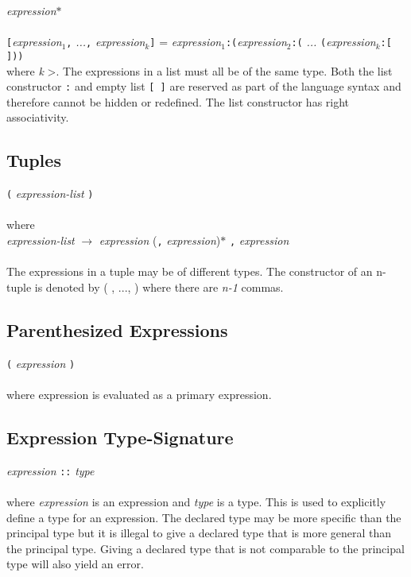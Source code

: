   \emph{expression}$*$ \\ \\
\texttt{[}\emph{expression$_{1}$}\texttt{,} \emph{...}\texttt{,} \emph{expression$_{k}$}\texttt{]} = 
  \emph{expression$_{1}$}\texttt{:(}\emph{expression$_{2}$}\texttt{:(} \emph{...} \texttt{(}\emph{expression$_{k}$}\texttt{:[ ]))} \\ 
where \textit{k} \textgreater{}. The expressions in a list must all be of the same type. Both the list constructor \texttt{:} and empty list \texttt{[ ]} are reserved as part of the language syntax and therefore cannot be hidden or redefined. The list constructor has right associativity.

\subsection{Tuples}
  \texttt{(} \emph{expression-list} \texttt{)} \\ \\
  where \\
  
  \emph{expression-list} $\rightarrow$  \emph{expression} (\texttt{,} \emph{expression})$*$  \texttt{,} \emph{expression} \\ \\
The expressions in a tuple may be of different types. The constructor of an n-tuple is denoted by (\textunderscore
, ..., \textunderscore) where there are \textit{n-1} commas.

\subsection{Parenthesized Expressions}
  \texttt{(} \emph{expression} \texttt{)} \\ \\
  where expression is evaluated as a primary expression.

\subsection{Expression Type-Signature}
  \emph{expression} \texttt{::} \emph{type} \\ \\
  where \emph{expression} is an expression and \emph{type} is a type. This is used to explicitly define a type for an expression. The declared type may be more specific than the principal type but it is illegal to give a declared type that is more general than the principal type. Giving a declared type that is not comparable to the principal type will also yield an error.

